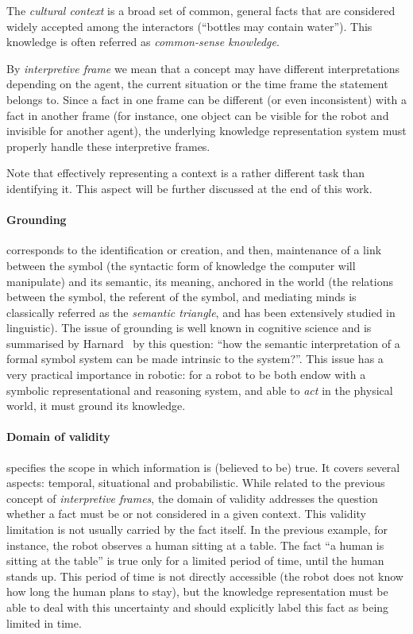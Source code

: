 The \textit{cultural context} is a broad set of common, general facts that are
considered widely accepted among the interactors (\eg ``bottles may contain
water''). This knowledge is often referred as \emph{common-sense knowledge}.

By \emph{interpretive frame} we mean that a concept may have different
interpretations depending on the agent, the current situation or the time frame
the statement belongs to. Since a fact in one frame can be different (or even
inconsistent) with a fact in another frame (for instance, one object can be
visible for the robot and invisible for another agent), the underlying
knowledge representation system must properly handle these interpretive
frames.

Note that effectively representing a context is a rather different task than
identifying it. This aspect will be further discussed at the end of this work.

\paragraph{Grounding} corresponds to the identification or creation, and then,
maintenance of a link between the symbol (the syntactic form of knowledge
the computer will manipulate) and its semantic, \ie its meaning, anchored in
the world (the relations between the symbol, the referent of the symbol, and
mediating minds is classically referred as the \emph{semantic triangle}, and has
been extensively studied in linguistic). The issue of grounding is well known
in cognitive science and is summarised by Harnard~\cite{Harnad1990} by this
question: ``how the semantic interpretation of a formal symbol system can be
made intrinsic to the system?''. This issue has a very practical importance in
robotic: for a robot to be both endow with a symbolic representational and
reasoning system, and able to \emph{act} in the physical world, it must ground
its knowledge.

\paragraph{Domain of validity} specifies the scope in which
 information is (believed to be) true. It covers several aspects: temporal,
situational and probabilistic. While related to the previous concept of
\emph{interpretive frames}, the domain of validity addresses the question
whether a fact must be or not considered in a given context. This validity
limitation is not usually carried by the fact itself. In the previous example,
for instance, the robot observes a human sitting at a table.  The fact ``a
human is sitting at the table'' is true only for a limited period of time,
until the human stands up. This period of time is not directly accessible
(the robot does not know how long the human plans to stay), but the
knowledge representation must be able to deal with this uncertainty and
should explicitly label this fact as being limited in time.

